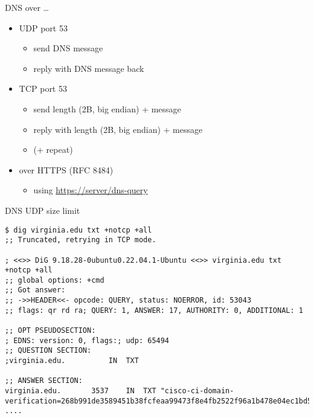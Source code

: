 \begin{frame}{DNS over \ldots}
    \begin{itemize}
    \item UDP port 53
        \begin{itemize}
        \item send DNS message
        \item reply with DNS message back
        \end{itemize}
    \item TCP port 53
        \begin{itemize}
        \item send length (2B, big endian) + message
        \item reply with length (2B, big endian) + message
        \item (+ repeat)
        \end{itemize}
    \item over HTTPS (RFC 8484)
        \begin{itemize}
        \item using \url{https://server/dns-query}
        \end{itemize}
    \end{itemize}
\end{frame}

\begin{frame}[fragile]{DNS UDP size limit}
\begin{Verbatim}[fontsize=\fontsize{9}{10}]
$ dig virginia.edu txt +notcp +all
;; Truncated, retrying in TCP mode.

; <<>> DiG 9.18.28-0ubuntu0.22.04.1-Ubuntu <<>> virginia.edu txt +notcp +all
;; global options: +cmd
;; Got answer:
;; ->>HEADER<<- opcode: QUERY, status: NOERROR, id: 53043
;; flags: qr rd ra; QUERY: 1, ANSWER: 17, AUTHORITY: 0, ADDITIONAL: 1

;; OPT PSEUDOSECTION:
; EDNS: version: 0, flags:; udp: 65494
;; QUESTION SECTION:
;virginia.edu.			IN	TXT

;; ANSWER SECTION:
virginia.edu.		3537	IN	TXT	"cisco-ci-domain-verification=268b991de3589451b38fcfeaa99473f8e4fb2522f96a1b478e04ec1bd5a25ff9"
....
\end{Verbatim}
\end{frame}

